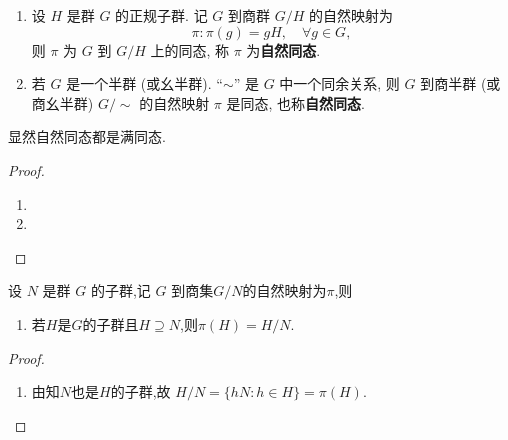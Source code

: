 \documentclass[../../main.tex]{subfiles}%
\begin{document}
\begin{theorem}\label{theorem:抽象代数--1.5.}
\begin{enumerate}
\item 设 \( H \) 是群 \( G \) 的正规子群. 记 \( G \) 到商群 \( G/H \) 的自然映射为
\[
\pi: \pi(g) = gH, \quad \forall g \in G,
\]
则 \( \pi \) 为 \( G \) 到 \( G/H \) 上的同态, 称 \( \pi \) 为\textbf{自然同态}.

\item 若 \( G \) 是一个半群 (或幺半群). “\(\sim\)” 是 \( G \) 中一个同余关系, 则 \( G \) 到商半群 (或商幺半群) \( G/\sim \) 的自然映射 \( \pi \) 是同态, 也称\textbf{自然同态}.
\end{enumerate}
\end{theorem}
\begin{remark}
显然自然同态都是满同态.
\end{remark}
\begin{proof}
\begin{enumerate}
\item 

\item 
\end{enumerate}

\end{proof}

\begin{proposition}\label{proposition:群的自然映射的基本性质}
设 \( N \) 是群 \( G \) 的子群,记 \( G \) 到商集\( G/N \)的自然映射为$\pi$,则
\begin{enumerate}[(1)]
\item\label{proposition:群的自然映射的基本性质-1} 若$H$是$G$的子群且$H\supseteq N$,则$\pi(H)=H/N.$

\end{enumerate}
\end{proposition}
\begin{proof}
\begin{enumerate}[(1)]
\item 由知$N$也是$H$的子群,故
$H/N=\{hN:h\in H\}=\pi(H).$
\end{enumerate}

\end{proof}
\end{document}
